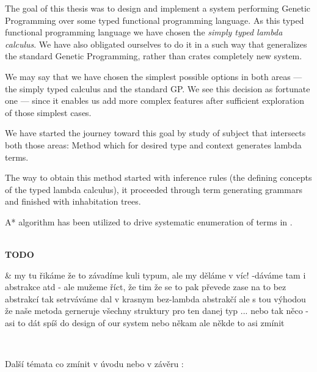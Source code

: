 \documentclass[12pt,a4paper]{report}
\newenvironment{todo}
{ ~\\[0.5em]
  {\color{red}\textbf{TODO}}
  \begin{easylist}[itemize]}
{ \end{easylist}
  ~}
\begin{document}
The goal of this thesis was to design and implement a system
performing Genetic Programming over some typed functional programming language.
As this typed functional programming language we have chosen the 
\textit{simply typed lambda calculus}.
We have also obligated ourselves to do it in a such way that 
generalizes the standard Genetic Programming, rather than
crates completely new system.

We may say that we have chosen the simplest possible
options in both areas --- the simply typed calculus and the standard GP.
We see this decision as fortunate one --- since it enables us add more
complex features after sufficient exploration of those simplest cases.
   
We have started the journey toward this goal by study 
of subject that intersects both those areas:
Method which for desired type and context generates lambda terms.  

The way to obtain this method started with inference rules 
(the defining concepts of the typed lambda calculus),
it proceeded through term generating grammars and finished 
with inhabitation trees.

A* algorithm has been utilized to drive systematic enumeration
of terms in \lnf.









\newpage
\begin{todo}
 & my tu řikáme že to závadíme kuli typum, ale my děláme v víc! -dáváme tam
   i abstrakce atd - ale mužeme říct, že tim že se to pak převede zase na 
   to bez abstrakcí tak setrváváme dal v krasnym bez-lambda abstrakčí ale
   s tou výhodou že naše metoda gerneruje všechny struktury pro ten danej typ ...
   nebo tak něco - asi to dát spíš do design of our system nebo někam
   ale někde to asi zmínit
\end{todo}


Další témata co zmínit v úvodu nebo v závěru :\\
\end{document}
